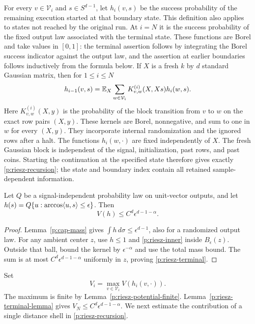 For every $v\in\mathcal V_i$ and $s\in S^{d-1}$, let $h_i(v,s)$ be
the success probability of the remaining execution started at that
boundary state.  This definition also applies to states not reached
by the original run.  At $i=N$ it is the success probability of the
fixed output law associated with the terminal state.  These functions
are Borel and take values in $[0,1]$: the terminal assertion follows
by integrating the Borel success indicator against the output law,
and the assertion at earlier boundaries follows inductively from
the formula below.  If $X$ is a fresh $k$ by $d$ standard Gaussian
matrix, then for $1\le i\le N$
\begin{equation}\label{p:riesz-recursion}
 h_{i-1}(v,s)
 =\mathbb E_X\sum_{w\in\mathcal V_i}K^{(i)}_{v,w}(X,Xs)h_i(w,s).
\end{equation}
Here $K^{(i)}_{v,w}(X,y)$ is the probability of the block transition
from $v$ to $w$ on the exact row pairs $(X,y)$.  These kernels are
Borel, nonnegative, and sum to one in $w$ for every $(X,y)$.
They incorporate internal randomization and the ignored rows after a
halt.  The functions $h_i(w,\cdot)$ are fixed independently of $X$.
The fresh Gaussian block is independent of the signal, initialization,
past rows, and past coins. Starting the continuation at the specified
state therefore gives exactly \eqref{p:riesz-recursion}; the state and
boundary index contain all retained sample-dependent information.

\begin{lemma}\label{p:riesz-terminal-lemma}
Let $Q$ be a signal-independent probability law on unit-vector outputs,
and let $h(s)=Q\{u:\arccos\langle u,s\rangle\le\epsilon\}$. Then
\begin{equation}\label{p:riesz-terminal}
 V(h)\le C^d\epsilon^{d-1-\alpha}.
\end{equation}
\end{lemma}

\begin{proof}
Lemma~\ref{p:cap-mass} gives $\int h\,d\sigma\le\epsilon^{d-1}$,
also for a randomized output law. For any ambient center $z$, use
$h\le1$ and \eqref{p:riesz-inner} inside $B_\epsilon(z)$. Outside
that ball, bound the kernel by $\epsilon^{-\alpha}$ and use the total
mass bound. The sum is at most $C^d\epsilon^{d-1-\alpha}$ uniformly
in $z$, proving \eqref{p:riesz-terminal}.
\end{proof}

Set
\[
 V_i=\max_{v\in\mathcal V_i}V(h_i(v,\cdot)).
\]
The maximum is finite by Lemma~\ref{p:riesz-potential-finite}.
Lemma~\ref{p:riesz-terminal-lemma} gives $V_N\le C^d\epsilon^{d-1-\alpha}$.
We next estimate the contribution of a single distance shell in
\eqref{p:riesz-recursion}.


